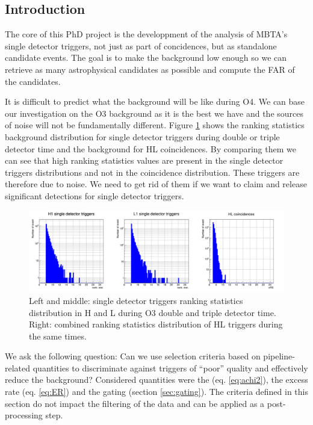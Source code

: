 \subsection{Introduction}
\label{sec:selec_motiv}
The core of this PhD project is the developpment of the analysis of MBTA's single detector triggers, not just as part of concidences, but as standalone candidate events.
The goal is to make the background low enough so we can retrieve as many astrophysical candidates as possible and compute the FAR of the candidates.

It is difficult to predict what the background will be like during O4.
We can base our investigation on the O3 background as it is the best we have and the sources of noise will not be fundamentally different.
Figure \ref{fig:compare_bkg} shows the ranking statistics background distribution for single detector triggers during double or triple detector time and the background for HL coincidences.
By comparing them we can see that high ranking statistics values are present in the single detector triggers distributions and not in the coincidence distribution.
These triggers are therefore due to noise.
We need to get rid of them if we want to claim and release significant detections for single detector triggers.
%
\begin{figure}[ht]
  \centering
  \includegraphics[width=\linewidth]{sectionSelection/plotsOther/cCompareSingleCoinc.png}
  \caption{Left and middle: single detector triggers ranking statistics distribution in H and L during O3 double and triple detector time. Right: combined ranking statistics distribution of HL triggers during the same times.}
  \label{fig:compare_bkg}
\end{figure}
%

We ask the following question: Can we use selection criteria based on pipeline-related quantities to discriminate against triggers of ``poor'' quality and effectively reduce the background?
Considered quantities were the \achi (eq. \ref{eq:achi2}), the excess rate (eq. \ref{eq:ER}) and the gating (section \ref{sec:gating}).
The criteria defined in this section do not impact the filtering of the data and can be applied as a post-processing step.

